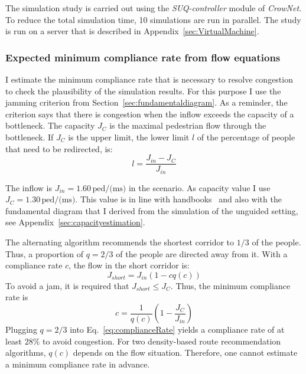 The simulation study is carried out using the \textit{SUQ-controller} module of \textit{CrowNet}. To reduce the total simulation time, 10 simulations are run in parallel. The study is run on a server that is described in Appendix~\ref{sec:VirtualMachine}.


\subsubsection{Expected minimum compliance rate from flow equations}
I estimate the minimum compliance rate that is necessary to resolve congestion to check the plausibility of the simulation results. For this purpose I use the jamming criterion from Section~\ref{sec:fundamentaldiagram}. As a reminder, the criterion says that there is congestion when the inflow exceeds the capacity of a bottleneck. The capacity $J_C$ is the maximal pedestrian flow through the bottleneck. If $J_C$ is the upper limit, the lower limit $l$ of the percentage of people that need to be redirected, is:
\begin{equation}
l = \frac{J_{in}-J_{C}}{J_{in}}
\label{fig:jammingCrit}
\end{equation}

The inflow is $J_{in}=1.60\,\text{ped/(ms)}$ in the scenario. As capacity value I use $J_C=1.30\,\text{ped/(ms)}$. This value is in line with handbooks~\cite{weidmann-1994-cdyn,hurley-2016-cdyn} and also with the fundamental diagram that I derived from the simulation of the unguided setting, see Appendix~\ref{sec:capacityestimation}.

The alternating algorithm recommends the shortest corridor to $1/3$ of the people. Thus, a proportion of $q=2/3$ of the people are directed away from it. With a compliance rate $c$, the flow in the short corridor is:
\begin{equation}
J_{short} = J_{in}(1- c q(c))
\end{equation}
To avoid a jam, it is required that $J_{short} \leq J_C$. Thus, the minimum compliance rate is 
\begin{equation}
c = \frac{1}{q(c)}\left( 1- \frac{J_C}{J_{in}} \right)
\label{eq:complianceRate}
\end{equation}
Plugging $q=2/3$ into Eq.~\ref{eq:complianceRate} yields a compliance rate of at least $28\%$ to avoid congestion. 
%
For two density-based route recommendation algorithms, $q(c)$ depends on the flow situation.  Therefore, one cannot estimate a minimum compliance rate in advance.



